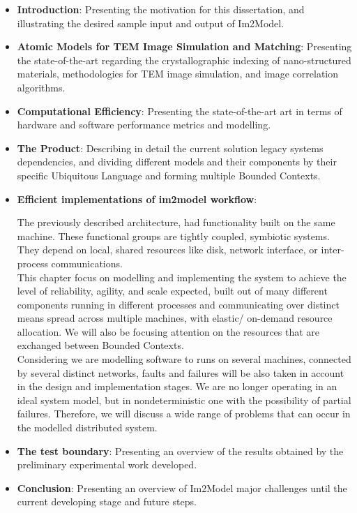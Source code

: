 \documentclass[
  oneside,
  11pt, a4paper,
  footinclude=true,
  headinclude=true,
  cleardoublepage=empty
]{scrbook}
\begin{document}
\begin{itemize}
    \item \textbf{Introduction}: Presenting the motivation for this dissertation, and illustrating the desired sample input and output of Im2Model.
    
     \item \textbf{Atomic Models for TEM Image Simulation and Matching}:
    Presenting the state-of-the-art regarding the  crystallographic indexing of nano-structured materials,  methodologies for TEM image simulation, and image correlation algorithms.
        
    \item \textbf{Computational Efficiency}:  Presenting the state-of-the-art art in terms of hardware and
software performance metrics and modelling.

    \item \textbf{The Product}:
    Describing in detail the current solution legacy systems dependencies, and dividing different models and their components by their specific Ubiquitous Language and forming multiple Bounded Contexts.\\
    
    
    
     
     
    
    \item \textbf{Efficient implementations of im2model workflow}:
    
    
    The previously described architecture, had functionality built on the same machine. These functional groups are tightly coupled, symbiotic systems. They depend on local, shared resources like disk, network interface, or inter-process communications. \\

    This chapter focus on modelling and implementing the system to achieve the level of reliability, agility, and scale expected, built out of many different components running in different processes and communicating over distinct means spread across multiple machines, 
    with elastic/ on-demand resource allocation. We will also be focusing attention on the resources that are exchanged between Bounded Contexts.\\
    Considering we are modelling software to runs on several machines, connected by several distinct networks, faults and failures will be also taken in account in the design and implementation stages. We are no longer operating in an ideal system model, but in nondeterministic one with the possibility of partial failures. Therefore, we will discuss a wide range of problems that can occur in the modelled distributed system.    

    
        \item \textbf{The test boundary}:  Presenting an overview of the  results obtained by
the preliminary experimental work developed.

            \item \textbf{Conclusion}: Presenting an overview of  Im2Model major challenges until the current developing stage and future steps.


\end{itemize}
\end{document}
